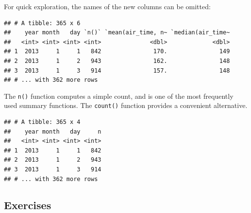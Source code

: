 \documentclass[]{book}
\newenvironment{Shaded}{}{}
\newcommand{\DataTypeTok}[1]{#1}
\newcommand{\KeywordTok}[1]{\textcolor[rgb]{0.00,0.00,1.00}{#1}}
\newcommand{\NormalTok}[1]{#1}
\newcommand{\OperatorTok}[1]{#1}
\newcommand{\OtherTok}[1]{\textcolor[rgb]{1.00,0.25,0.00}{#1}}
\newcommand{\StringTok}[1]{\textcolor[rgb]{0.00,0.50,0.50}{#1}}
\begin{document}
For quick exploration, the names of the new columns can be omitted:

\begin{Shaded}
\end{Shaded}

\begin{verbatim}
## # A tibble: 365 x 6
##    year month   day `n()` `mean(air_time, n~ `median(air_time~
##   <int> <int> <int> <int>              <dbl>             <dbl>
## 1  2013     1     1   842               170.               149
## 2  2013     1     2   943               162.               148
## 3  2013     1     3   914               157.               148
## # ... with 362 more rows
\end{verbatim}

The \texttt{n()} function computes a simple count, and is one of the most frequently used summary functions.
The \texttt{count()} function provides a convenient alternative.

\begin{Shaded}
\end{Shaded}

\begin{verbatim}
## # A tibble: 365 x 4
##    year month   day     n
##   <int> <int> <int> <int>
## 1  2013     1     1   842
## 2  2013     1     2   943
## 3  2013     1     3   914
## # ... with 362 more rows
\end{verbatim}

\hypertarget{exercises-5}{%
\subsection*{Exercises}\label{exercises-5}}
\end{document}
